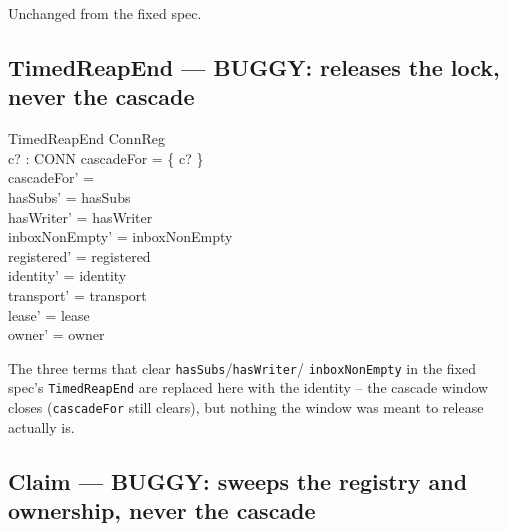 \documentclass[a4paper,10pt,fleqn]{article}
\begin{document}
Unchanged from the fixed spec.

\subsection{TimedReapEnd --- BUGGY: releases the lock, never the cascade}
\label{sec:timedreapend}

\begin{schema}{TimedReapEnd}
  \Delta ConnReg \\
  c? : CONN
\where
  cascadeFor = \{ c? \} \\
  cascadeFor' = \emptyset \\
  hasSubs' = hasSubs \\
  hasWriter' = hasWriter \\
  inboxNonEmpty' = inboxNonEmpty \\
  registered' = registered \\
  identity' = identity \\
  transport' = transport \\
  lease' = lease \\
  owner' = owner
\end{schema}

The three terms that clear \texttt{hasSubs}/\texttt{hasWriter}/
\texttt{inboxNonEmpty} in the fixed spec's \texttt{TimedReapEnd} are
replaced here with the identity -- the cascade window closes
(\texttt{cascadeFor} still clears), but nothing the window was meant to
release actually is.

\subsection{Claim --- BUGGY: sweeps the registry and ownership, never the
cascade}
\label{sec:claim}
\end{document}
